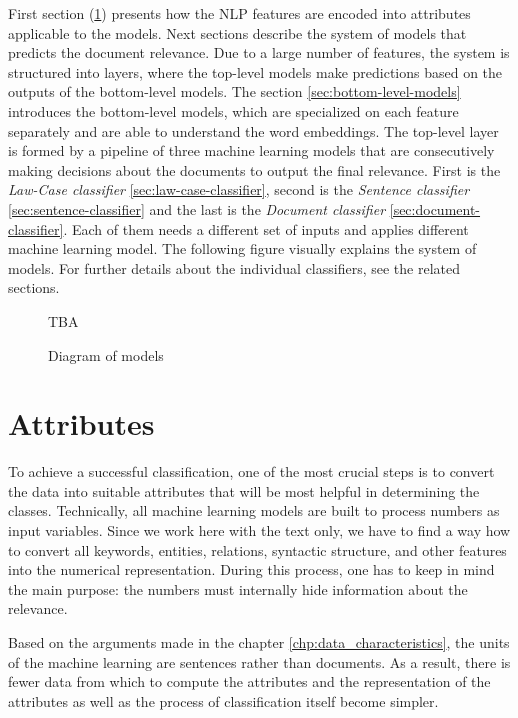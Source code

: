 \documentclass[
  digital, %
  notable,   %
  nolof,     %
  nolot,     %
  draft
]{fithesis3}
\begin{document}
First section (\ref{sec:attributes}) presents how the NLP features are encoded into attributes applicable to the models.
Next sections describe the system of models that predicts the document relevance.
Due to a large number of features, the system is structured into layers, where the top-level models make predictions based on the outputs of the bottom-level models.
The section \ref{sec:bottom-level-models} introduces the bottom-level models, which are specialized on each feature separately and are able to understand the word embeddings.
The top-level layer is formed by a pipeline of three machine learning models that are consecutively making decisions about the documents to output the final relevance.
First is the \textit{Law-Case classifier} \ref{sec:law-case-classifier}, second is the \textit{Sentence classifier} \ref{sec:sentence-classifier} and the last is the \textit{Document classifier} \ref{sec:document-classifier}.
Each of them needs a different set of inputs and applies different machine learning model.
The following figure visually explains the system of models.
For further details about the individual classifiers, see the related sections.


\begin{figure}[H]
\caption{Diagram of models}
\label{fig:models-diagram}
TBA
\end{figure}

\section{Attributes}
\label{sec:attributes}
To achieve a successful classification, one of the most crucial steps is to convert the data into suitable attributes that will be most helpful in determining the classes.
Technically, all machine learning models are built to process numbers as input variables.
Since we work here with the text only, we have to find a way how to convert all keywords, entities, relations, syntactic structure, and other features into the numerical representation.
During this process, one has to keep in mind the main purpose: the numbers must internally hide information about the relevance.

Based on the arguments made in the chapter \ref{chp:data_characteristics}, the units of the machine learning are sentences rather than documents.
As a result, there is fewer data from which to compute the attributes and the representation of the attributes as well as the process of classification itself become simpler.
\end{document}
